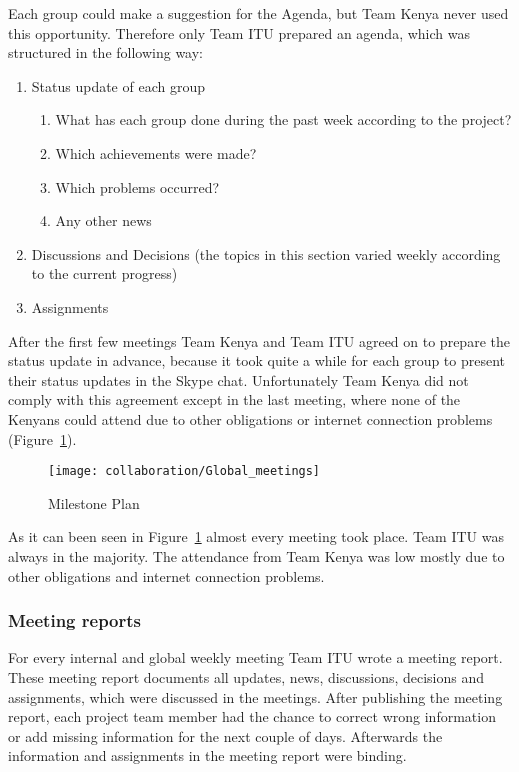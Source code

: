 Each group could make a suggestion for the Agenda, but Team Kenya never used this opportunity. Therefore only Team ITU prepared an agenda, which was structured in the following way:

	\begin{enumerate}
		\item Status update of each group
			\begin{enumerate}
				\item What has each group done during the past week according to the project?
				\item Which achievements were made?	
				\item Which problems occurred?
				\item Any other news
			\end{enumerate}
		\item Discussions and Decisions (the topics in this section varied weekly according to the current progress)
		\item Assignments
	\end{enumerate}

After the first few meetings Team Kenya and Team ITU agreed on to prepare the status update in advance, because it took quite a while for each group to present their status updates in the Skype chat. Unfortunately Team Kenya did not comply with this agreement except in the last meeting, where none of the Kenyans could attend due to other obligations or internet connection problems (Figure~\ref{fig:global_meetings}).

	\begin{figure}[ht]
		\centering
		\texttt{[image: collaboration/Global\_meetings]}
		\caption{Milestone Plan}
		\label{fig:global_meetings}
	\end{figure}

As it can been seen in Figure~\ref{fig:global_meetings} almost every meeting took place. Team ITU was always in the majority. The attendance from Team Kenya was low mostly due to other obligations and internet connection problems.

\subsubsection {Meeting reports}

For every internal and global weekly meeting Team ITU wrote a meeting report. These meeting report documents all updates, news, discussions, decisions and assignments, which were discussed in the meetings. After publishing the meeting report, each project team member had the chance to correct wrong information or add missing information for the next couple of days. Afterwards the information and assignments in the meeting report were binding.

